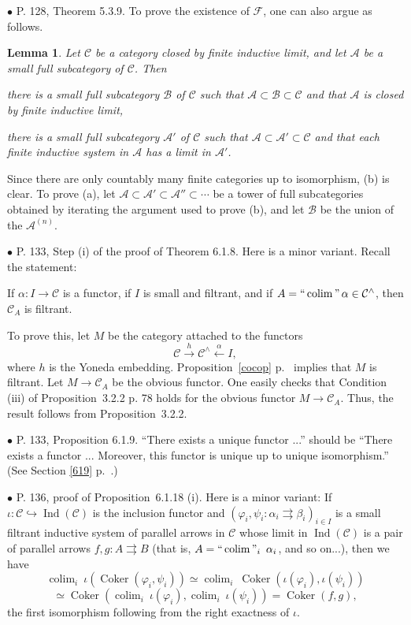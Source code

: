 \documentclass[12pt]{article}
\newtheorem{lem}[thm]{Lemma}
\theoremstyle{remark}%
\newcommand{\bu}{\bullet}
\newcommand{\n}{\noindent}
\newcommand{\A}{\mathcal A}
\newcommand{\B}{\mathcal B}
\newcommand{\C}{\mathcal C}
\newcommand{\F}{\mathcal F}
\newcommand{\p}{\varphi}
\newcommand{\pa}{\rightrightarrows}
\newcommand{\pr}{Proposition}
\DeclareMathOperator*{\coli}{colim}
\DeclareMathOperator*{\co}{colim}
\DeclareMathOperator*{\ic}{``\coli"}
\DeclareMathOperator{\Coker}{Coker}
\DeclareMathOperator{\Ind}{Ind}
\begin{document}
\n$\bu$ P. 128, Theorem 5.3.9. To prove the existence of $\F$, one can also argue as follows. 
% 
\begin{lem} 
% 
Let $\C$ be a category closed by finite inductive limit, and let $\A$ be a small full subcategory of $\C$. Then 

\n{\em(a)} there is a small full subcategory $\B$ of $\C$ such that $\A\subset\B\subset \C$ and that $\A$ is closed by finite inductive limit, 

\n{\em(b)} there is a small full subcategory $\A'$ of $\C$ such that $\A\subset\A'\subset \C$ and that each finite inductive system in $\A$ has a limit in $\A'$. 
%
\end{lem} 
% 
\n{\em Proof.} Since there are only countably many finite categories up to isomorphism, (b) is clear. To prove (a), let $\A\subset\A'\subset\A''\subset\cdots$ be a tower of full subcategories obtained by iterating the argument used to prove (b), and let $\B$ be the union of the $\A^{(n)}$. 


\n$\bu$ P. 133, Step (i) of the proof of Theorem 6.1.8. Here is a minor variant. Recall the statement: 

If $\alpha:I\to\C$ is a functor, if $I$ is small and filtrant, and if $A=\ic\alpha\in\C^\wedge$, then $\C_A$ is filtrant. 

To prove this, let $M$ be the category attached to the functors 
$$
\C\xrightarrow h\C^\wedge\xleftarrow\alpha I,
$$ 
where $h$ is the Yoneda embedding. \pr\ \ref{cocop} p.~\pageref{cocop} implies that $M$ is filtrant. Let $M\to\C_A$ be the obvious functor. One easily checks that Condition (iii) of \pr\ 3.2.2 p. 78 holds for the obvious functor $M\to\C_A$. Thus, the result follows from \pr\ 3.2.2. 


\n$\bu$ P. 133, Proposition 6.1.9. ``There exists a unique functor ...'' should be ``There exists a functor ... Moreover, this functor is unique up to unique isomorphism.'' (See Section \ref{619} p.~\pageref{619}.) 


\n$\bu$ P. 136, proof of \pr\ 6.1.18 (i). Here is a minor variant: If $\iota:\C\hookrightarrow\Ind(\C)$ is the inclusion functor and $(\p_i,\psi_i:\alpha_i\pa\beta_i)_{i\in I}$ is a small filtrant inductive system of parallel arrows in $\C$ whose limit in $\Ind(\C)$ is a pair of parallel arrows $f,g:A\pa B$ (that is, $A=\ic_i\ \alpha_i$, and so on...), then we have 
$$
\co_i\ \iota(\Coker(\p_i,\psi_i))\simeq
\co_i\ \Coker(\iota(\p_i),\iota(\psi_i))
$$
$$
\simeq
\Coker(\co_i\ \iota(\p_i),\co_i\ \iota(\psi_i))=
\Coker(f,g),
$$ 
the first isomorphism following from the right exactness of $\iota$. 
\end{document}
